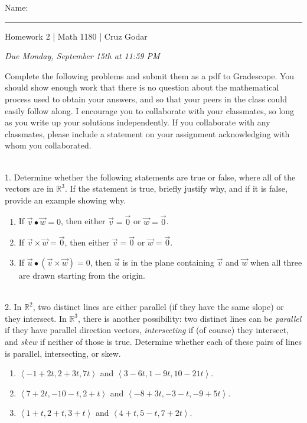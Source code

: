 \documentclass{article}
\begin{document}
\Large Name: \rule{2in}{0.15mm} \hfill Homework 2 | Math 1180 | Cruz Godar \vspace{4pt} \normalsize

\textit{Due Monday, September 15th at 11:59 PM}

Complete the following problems and submit them as a pdf to Gradescope. You should show enough work that there is no question about the mathematical process used to obtain your answers, and so that your peers in the class could easily follow along. I encourage you to collaborate with your classmates, so long as you write up your solutions independently. If you collaborate with any classmates, please include a statement on your assignment acknowledging with whom you collaborated.

~\\

1. Determine whether the following statements are true or false, where all of the vectors are in $\mathbb{R}^3$. If the statement is true, briefly justify why, and if it is false, provide an example showing why.

\begin{enumerate}

	\item If $\vec{v} \bullet \vec{w} = 0$, then either $\vec{v} = \vec{0}$ or $\vec{w} = \vec{0}$.

	\item If $\vec{v} \times \vec{w} = \vec{0}$, then either $\vec{v} = \vec{0}$ or $\vec{w} = \vec{0}$.

	\item If $\vec{u} \bullet \left( \vec{v} \times \vec{w} \right) = 0$, then $\vec{u}$ is in the plane containing $\vec{v}$ and $\vec{w}$ when all three are drawn starting from the origin.

\end{enumerate}

~\\

2. In $\mathbb{R}^2$, two distinct lines are either parallel (if they have the same slope) or they intersect. In $\mathbb{R}^3$, there is another possibility: two distinct lines can be \textit{parallel} if they have parallel direction vectors, \textit{intersecting} if (of course) they intersect, and \textit{skew} if neither of those is true. Determine whether each of these pairs of lines is parallel, intersecting, or skew.

\begin{enumerate}

	\item $\left< -1 + 2t, 2 + 3t, 7t \right>$ and $\left< 3 - 6t, 1 - 9t, 10 - 21t \right>$.

	\item $\left< 7 + 2t, -10 - t, 2 + t \right>$ and $\left< -8 + 3t, -3 - t, -9 + 5t \right>$.

	\item $\left< 1 + t, 2 + t, 3 + t \right>$ and $\left< 4 + t, 5 - t, 7 + 2t \right>$.

\end{enumerate}
\end{document}
